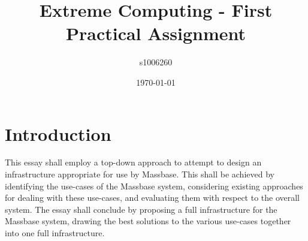 \documentclass[12pt,a4paper]{article}
\title{Extreme Computing - First Practical Assignment}
\author{s1006260}
\date{\today}
\begin{document}
\maketitle

\section{Introduction}
This essay shall employ a top-down approach to attempt to design an infrastructure appropriate for use by Massbase. This shall be achieved by identifying the use-cases of the Massbase system, considering existing approaches for dealing with these use-cases, and evaluating them with respect to the overall system. The essay shall conclude by proposing a full infrastructure for the Massbase system, drawing the best solutions to the various use-cases together into one full infrastructure.
\end{document}
